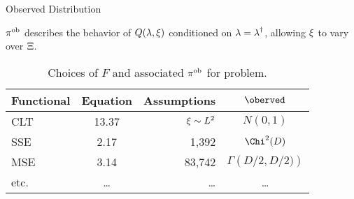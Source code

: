 \begin{block}{Observed Distribution}

    $\operatorname*{\pi^{ob}}$ describes the behavior of $Q(\operatorname*{\lambda}, \operatorname*{\xi})$ conditioned on $\operatorname*{\lambda} = \operatorname*{\lambda}^\dagger$, allowing $\operatorname*{\xi}$ to vary over $\operatorname*{\Xi}$.

    \begin{table}
      \centering
      \begin{tabular}{l c r c}
        \toprule
        \textbf{Functional} & \textbf{Equation} & \textbf{Assumptions} & \textbf{$\oberved$} \\
        \midrule
        CLT & 13.37 & $\operatorname*{\xi} \sim L^2$ & $N(0,1)$ \\
        SSE & 2.17 & 1,392 & $\Chi^2 (D)$ \\
        MSE & 3.14 & 83,742 & $\Gamma \left ( D/2, D/2) \right )$ \\
        etc. & \dots & \dots & \dots \\
        \bottomrule
      \end{tabular}
      \caption{Choices of $F$ and associated $\operatorname*{\pi^{ob}}$ for problem.}
    \end{table}


\end{block}

